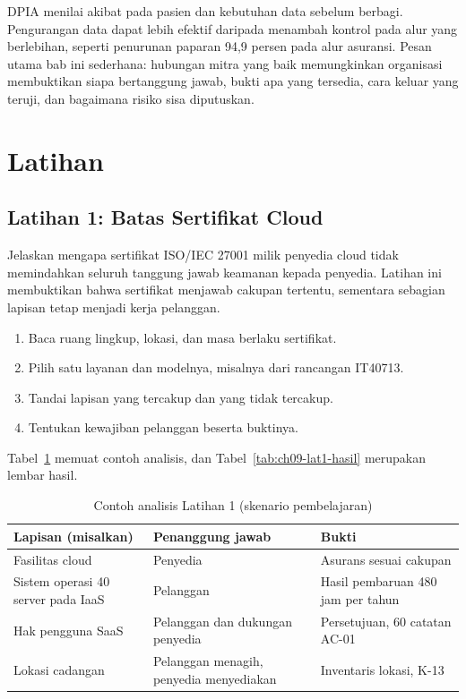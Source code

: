 DPIA menilai akibat pada pasien dan kebutuhan data sebelum berbagi. Pengurangan data dapat lebih
efektif daripada menambah kontrol pada alur yang berlebihan, seperti penurunan paparan 94,9 persen
pada alur asuransi. Pesan utama bab ini sederhana: hubungan mitra yang baik memungkinkan organisasi
membuktikan siapa bertanggung jawab, bukti apa yang tersedia, cara keluar yang teruji, dan bagaimana
risiko sisa diputuskan.

\section{Latihan}

\subsection*{Latihan 1: Batas Sertifikat Cloud}

Jelaskan mengapa sertifikat ISO/IEC 27001 milik penyedia cloud tidak memindahkan seluruh tanggung
jawab keamanan kepada penyedia. Latihan ini membuktikan bahwa sertifikat menjawab cakupan tertentu,
sementara sebagian lapisan tetap menjadi kerja pelanggan.

\begin{enumerate}
  \item Baca ruang lingkup, lokasi, dan masa berlaku sertifikat.
  \item Pilih satu layanan dan modelnya, misalnya dari rancangan IT40713.
  \item Tandai lapisan yang tercakup dan yang tidak tercakup.
  \item Tentukan kewajiban pelanggan beserta buktinya.
\end{enumerate}

Tabel~\ref{tab:ch09-lat1-contoh} memuat contoh analisis, dan Tabel~\ref{tab:ch09-lat1-hasil}
merupakan lembar hasil.

\begin{table}[!htb]
  \centering\small
  \caption{Contoh analisis Latihan 1 (skenario pembelajaran)}\label{tab:ch09-lat1-contoh}
  \begin{tabularx}{\textwidth}{|>{\raggedright\arraybackslash}X|>{\raggedright\arraybackslash}X|>{\raggedright\arraybackslash}X|}
    \hline
    \textbf{Lapisan (misalkan)} & \textbf{Penanggung jawab} & \textbf{Bukti} \\ \hline
    Fasilitas cloud & Penyedia & Asurans sesuai cakupan \\ \hline
    Sistem operasi 40 server pada IaaS & Pelanggan & Hasil pembaruan 480 jam per tahun \\ \hline
    Hak pengguna SaaS & Pelanggan dan dukungan penyedia & Persetujuan, 60 catatan AC-01 \\ \hline
    Lokasi cadangan & Pelanggan menagih, penyedia menyediakan & Inventaris lokasi, K-13 \\ \hline
  \end{tabularx}
\end{table}

